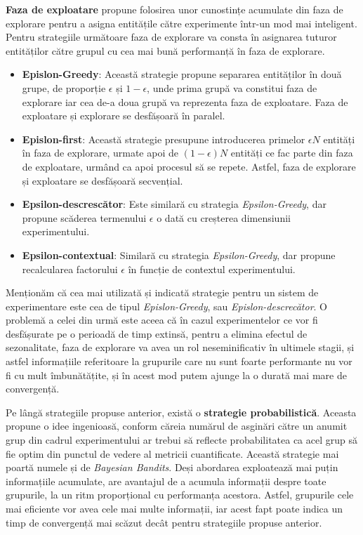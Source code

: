 \textbf{Faza de exploatare} propune folosirea unor cunostințe acumulate din faza de explorare pentru a asigna entitățile către experimente într-un mod mai inteligent. Pentru strategiile următoare faza de explorare va consta în asignarea tuturor entităților către grupul cu cea mai bună performanță în faza de explorare.

\begin{itemize}
	\item \textbf{Epislon-Greedy}: Această strategie propune separarea entităților în două grupe, de proporție $\epsilon$ și $1 - \epsilon$, unde prima grupă va constitui faza de explorare iar cea de-a doua grupă va reprezenta faza de exploatare. Faza de exploatare și explorare se desfășoară în paralel.
	\item \textbf{Epislon-first}: Această strategie presupune introducerea primelor $\epsilon N$ entități în faza de explorare, urmate apoi de $(1-\epsilon)N$ entități ce fac parte din faza de exploatare, urmând ca apoi procesul să se repete. Astfel, faza de explorare și exploatare se desfășoară secvențial.
	\item \textbf{Epsilon-descrescător}: Este similară cu strategia \textit{Epsilon-Greedy}, dar propune scăderea termenului $\epsilon$ o dată cu creșterea dimensiunii experimentului.
	\item \textbf{Epsilon-contextual}: Similară cu strategia \textit{Epsilon-Greedy}, dar propune recalcularea factorului $\epsilon$ în funcție de contextul experimentului.
\end{itemize}

Menționăm că cea mai utilizată și indicată strategie pentru un sistem de experimentare este cea de tipul \textit{Epislon-Greedy}, sau \textit{Epislon-descrecător}. O problemă a celei din urmă este aceea că în cazul experimentelor ce vor fi desfășurate pe o perioadă de timp extinsă, pentru a elimina efectul de sezonalitate, faza de explorare va avea un rol neseminificativ în ultimele stagii, și astfel informațiile referitoare la grupurile care nu sunt foarte performante nu vor fi cu mult îmbunătățite, și în acest mod putem ajunge la o durată mai mare de convergență.

Pe lângă strategiile propuse anterior, există o \textbf{strategie probabilistică}. Aceasta propune o idee ingenioasă, conform căreia numărul de asginări către un anumit grup din cadrul experimentului ar trebui să reflecte probabilitatea ca acel grup să fie optim din punctul de vedere al metricii cuantificate. Această strategie mai poartă numele și de \textit{Bayesian Bandits}. Deși abordarea exploatează mai puțin informațiile acumulate, are avantajul de a acumula informații despre toate grupurile, la un ritm proporțional cu performanța acestora. Astfel, grupurile cele mai eficiente vor avea cele mai multe informații, iar acest fapt poate indica un timp de convergență mai scăzut decât pentru strategiile propuse anterior.

